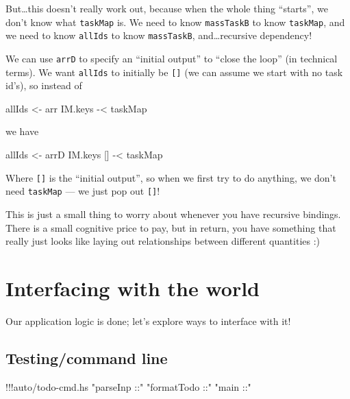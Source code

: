 \documentclass[]{article}
\newenvironment{Shaded}{}{}
\newcommand{\StringTok}[1]{\textcolor[rgb]{0.25,0.44,0.63}{{#1}}}
\newcommand{\OtherTok}[1]{\textcolor[rgb]{0.00,0.44,0.13}{{#1}}}
\newcommand{\FunctionTok}[1]{\textcolor[rgb]{0.02,0.16,0.49}{{#1}}}
\newcommand{\NormalTok}[1]{{#1}}
\begin{document}
But\ldots{}this doesn't really work out, because when the whole thing
``starts'', we don't know what \texttt{taskMap} is. We need to know
\texttt{massTaskB} to know \texttt{taskMap}, and we need to know
\texttt{allIds} to know \texttt{massTaskB}, and\ldots{}recursive
dependency!

We can use \texttt{arrD} to specify an ``initial output'' to ``close the
loop'' (in technical terms). We want \texttt{allIds} to initially be
\texttt{{[}{]}} (we can assume we start with no task id's), so instead
of

\begin{Shaded}
\begin{Highlighting}[]
\NormalTok{allIds }\OtherTok{<-} \NormalTok{arr IM.keys }\FunctionTok{-<} \NormalTok{taskMap}
\end{Highlighting}
\end{Shaded}

we have

\begin{Shaded}
\begin{Highlighting}[]
\NormalTok{allIds }\OtherTok{<-} \NormalTok{arrD IM.keys [] }\FunctionTok{-<} \NormalTok{taskMap}
\end{Highlighting}
\end{Shaded}

Where \texttt{{[}{]}} is the ``initial output'', so when we first try to
do anything, we don't need \texttt{taskMap} --- we just pop out
\texttt{{[}{]}}!

This is just a small thing to worry about whenever you have recursive
bindings. There is a small cognitive price to pay, but in return, you
have something that really just looks like laying out relationships
between different quantities :)

\section{Interfacing with the world}\label{interfacing-with-the-world}

Our application logic is done; let's explore ways to interface with it!

\subsection{Testing/command line}\label{testingcommand-line}

\begin{Shaded}
\begin{Highlighting}[]
\FunctionTok{!!!}\NormalTok{auto}\FunctionTok{/}\NormalTok{todo}\FunctionTok{-}\NormalTok{cmd}\FunctionTok{.}\NormalTok{hs }\StringTok{"parseInp ::"} \StringTok{"formatTodo ::"} \StringTok{"main ::"}
\end{Highlighting}
\end{Shaded}
\end{document}
